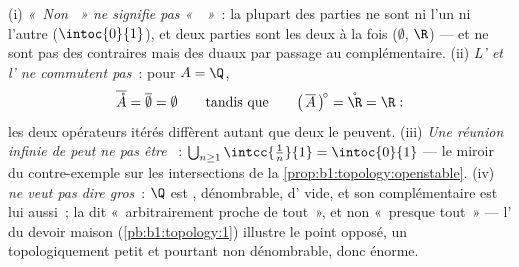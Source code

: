\begin{remark}
(i) \emph{«~Non ~» ne signifie pas «~~»}~: la plupart
des parties ne sont ni l'un ni l'autre ($\intoc{0}{1}$), et deux
parties sont les deux à la fois ($\emptyset$, $\R$) ---  et
 ne sont pas des contraires mais des duaux par passage au
complémentaire. (ii) \emph{L' et l' ne commutent
pas}~: pour $A = \Q$,
\[
\overline{\mathring A} = \overline\emptyset = \emptyset
\qquad\text{tandis que}\qquad
\bigl(\,\overline A\,\bigr)^{\!\circ} = \mathring \R = \R :
\]
les deux opérateurs itérés diffèrent autant que deux  le
peuvent. (iii) \emph{Une réunion infinie de  peut ne pas être
}~: $\bigcup_{n\geq1} \intcc{\frac1n}{1} = \intoc{0}{1}$ ---
le miroir du contre-exemple sur les intersections de
la \cref{prop:b1:topology:openstable}. (iv) \emph{ ne veut pas
dire gros}~: $\Q$ est , dénombrable, d' vide, et son
complémentaire est  lui aussi~; la  dit
«~arbitrairement proche de tout~», et non «~presque tout~» ---
l' du devoir maison (\cref{pb:b1:topology:1})
illustre le point opposé, un  topologiquement petit et
pourtant non dénombrable, donc énorme.
\end{remark}

